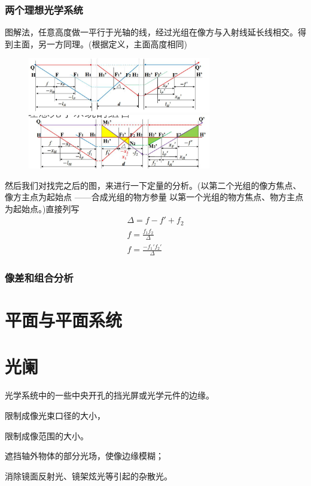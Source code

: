 \subsubsection{两个理想光学系统}
图解法，任意高度做一平行于光轴的线，经过光组在像方与入射线延长线相交。得到主面，另一方同理。(根据定义，主面高度相同)
        \begin{figure}[H]
            \centering
            \includegraphics[width=8cm]{img/3.8.png}
            \includegraphics[width=8cm]{img/3.9.png}
        \end{figure}
然后我们对找完之后的图，来进行一下定量的分析。(以第二个光组的像方焦点、像方主点为起始点
——合成光组的物方参量 以第一个光组的物方焦点、物方主点为起始点。)直接列写
\begin{align}
    \Delta =f-f'+f_2 \tag{2.3.7.a} \\
    f=\frac{f_1f_2}{\Delta} \tag{2.3.7.b} \\
    f=\frac{-f_1'f_2'}{\Delta}\tag{2.3.7.c}
\end{align}
\subsubsection{像差和组合分析}
\section{平面与平面系统}
\section{光阑}
\begin{description}[leftmargin=1.7cm,style=nextline,nosep]%
    \item[光阑 ]  光学系统中的一些中央开孔的挡光屏或光学元件的边缘。
    \item[孔径光阑    ] 限制成像光束口径的大小，
    \item[视场光阑    ] 限制成像范围的大小。
    \item[渐晕光阑
    ]遮挡轴外物体的部分光场，使像边缘模糊；

    
    \item[消杂光光阑    ]  消除镜面反射光、镜架炫光等引起的杂散光。

\end{description}
